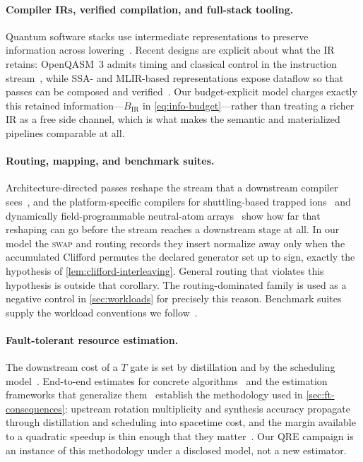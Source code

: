 \documentclass[a4paper,twocolumn,10pt,unpublished]{quantumarticle}
\begin{document}
\paragraph{Compiler IRs, verified compilation, and full-stack tooling.}
Quantum software stacks use intermediate representations to preserve
information across
lowering~\cite{steiger2018projectq,javadi2024qiskit,sivarajah2021tket,martiel2022architecture,watkins2024surfacecode,hietala2021verified,mills2021application,fellous2023optimizing}.
Recent designs are explicit about what the IR retains: OpenQASM~3 admits
timing and classical control in the instruction
stream~\cite{cross2022openqasm}, while SSA- and MLIR-based
representations expose dataflow so that passes can be composed and
verified~\cite{peduri2022qssa,mccaskey2021mlir}.  Our budget-explicit
model charges exactly this retained information---$B_{\mathrm{IR}}$ in
\cref{eq:info-budget}---rather than treating a richer IR as a free side
channel, which is what makes the semantic and materialized pipelines
comparable at all.

\paragraph{Routing, mapping, and benchmark suites.}
Architecture-directed passes reshape the stream that a downstream
compiler
sees~\cite{cowtan2019routing,li2019sabre,martiel2022architecture}, and
the platform-specific compilers for shuttling-based trapped
ions~\cite{kreppel2023shuttling} and dynamically field-programmable
neutral-atom arrays~\cite{tan2024dpqa} show how far that reshaping can
go before the stream reaches a downstream stage at all.  In
our model the \textsc{swap} and routing records they insert normalize
away only when the accumulated Clifford permutes the declared generator
set up to sign, exactly the hypothesis of
\cref{lem:clifford-interleaving}.  General routing that violates this
hypothesis is outside that corollary.  The
routing-dominated family is used as a negative control in
\cref{sec:workloads} for precisely this reason.  Benchmark suites
supply the workload conventions we
follow~\cite{quetschlich2023mqt,tomesh2022supermarq,mills2021application,li2023qasmbench}.

\paragraph{Fault-tolerant resource estimation.}
The downstream cost of a $T$ gate is set by distillation and by the
scheduling
model~\cite{bravyi2005magic,fowler2012surface,horsman2012lattice,litinski2019game,litinski2019magic}.
End-to-end estimates for concrete algorithms~\cite{gidney2021factor} and
the estimation frameworks that generalize
them~\cite{beverland2022assessing,watkins2024surfacecode} establish the
methodology used in \cref{sec:ft-consequences}: upstream rotation
multiplicity and synthesis accuracy propagate through distillation and
scheduling into spacetime cost, and the margin available to a quadratic speedup is
thin enough that they matter~\cite{babbush2021focus}.  Our QRE campaign
is an instance of this methodology under a disclosed model, not a new
estimator.
\end{document}

